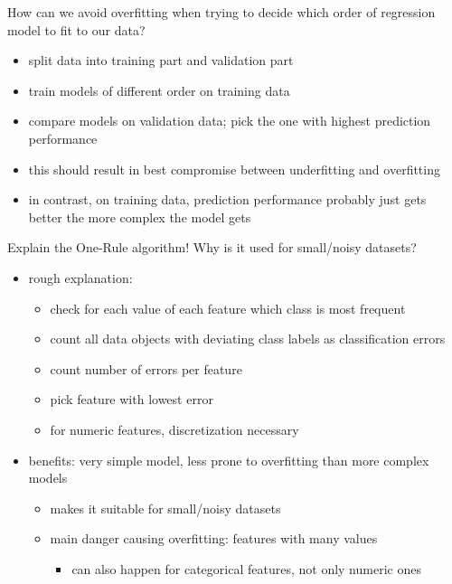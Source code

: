 \documentclass[12pt]{article}
\begin{document}
\begin{question}
	How can we avoid overfitting when trying to decide which order of regression model to fit to our data?
\end{question}

\begin{itemize}[left=0pt, nosep]
	\item split data into training part and validation part
	\item train models of different order on training data
	\item compare models on validation data; pick the one with highest prediction performance
	\item this should result in best compromise between underfitting and overfitting
	\item in contrast, on training data, prediction performance probably just gets better the more complex the model gets
\end{itemize}

\begin{question}
	Explain the One-Rule algorithm! Why is it used for small/noisy datasets?
\end{question}

\begin{itemize}[left=0pt, nosep]
	\item rough explanation:
	\begin{itemize}[left=0pt, nosep]
		\item check for each value of each feature which class is most frequent
		\item count all data objects with deviating class labels as classification errors
		\item count number of errors per feature
		\item pick feature with lowest error
		\item for numeric features, discretization necessary
	\end{itemize}
	\item benefits: very simple model, less prone to overfitting than more complex models
	\begin{itemize}[left=0pt, nosep]
		\item makes it suitable for small/noisy datasets
		\item main danger causing overfitting: features with many values
		\begin{itemize}[left=0pt, nosep]
			\item can also happen for categorical features, not only numeric ones
		\end{itemize}
	\end{itemize}
\end{itemize}
\end{document}
